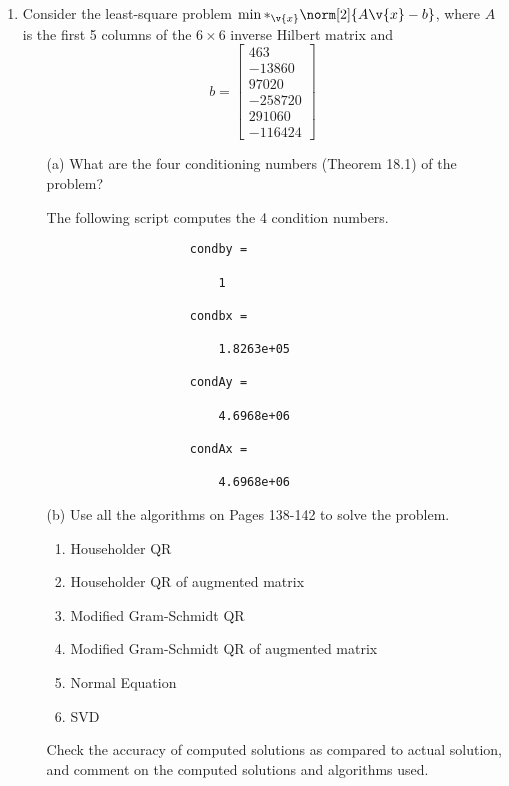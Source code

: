 \documentclass[11pt]{article}
\begin{document}
\begin{enumerate}
    \item %
        Consider the least-square problem $\min*_{\v{x}}\norm[2]{A\v{x} - b}$,
        where $A$ is the first 5 columns of the $6 \times 6$ inverse Hilbert
        matrix and
        \[
            b =
            \begin{bmatrix}
                463 \\
                -13860 \\
                97020 \\
                -258720 \\
                291060 \\
                -116424
            \end{bmatrix}
        \]
        \begin{enumerate}
            \item[(a)]
                What are the four conditioning numbers (Theorem 18.1) of the
                problem?

                The following script computes the 4 condition numbers.
                
                \begin{verbatim}
                    condby =

                        1

                    condbx =

                        1.8263e+05

                    condAy =

                        4.6968e+06

                    condAx =

                        4.6968e+06
                \end{verbatim}

            \item[(b)]
                Use all the algorithms on Pages 138-142 to solve the problem.
                \begin{enumerate}
                    \item Householder QR
                    \item Householder QR of augmented matrix
                    \item Modified Gram-Schmidt QR
                    \item Modified Gram-Schmidt QR of augmented matrix
                    \item Normal Equation
                    \item SVD
                \end{enumerate}
                Check the accuracy of computed solutions as compared to actual
                solution, and comment on the computed solutions and algorithms
                used.


\end{enumerate}
\end{enumerate}
\end{document}

